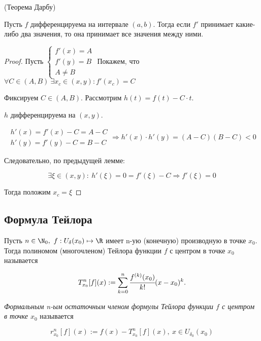 \begin{theorem}
	\hypertarget{thrm6.5}{(Теорема Дарбу)} Пусть $f$ дифференцируема на интервале $(a, b)$. Тогда если $f'$ принимает какие-либо два значения, то она принимает все значения между ними.  
\end{theorem}
\begin{proof} Пусть
	$\begin{cases}
		f'(x) = A \\
		f'(y) = B \\
		A \neq B
	\end{cases}$ Покажем, что $\forall C\in \left(A, B\right) \ \exists x_{c} \in (x,y): f'(x_{c}) = C $
	
	Фиксируем $C \in \left(A, B \right)$. Рассмотрим $h(t) = f(t) - C\cdot t$.
	
	$h$ дифференцируема на $(x,y)$. 
	
	$$\begin{gathered}
		h'(x) = f'(x) - C = A - C \\
		h'(y) = f'(y) - C = B-C
	\end{gathered}
	\Rightarrow h'(x)\cdot h'(y) = \left(A-C\right)\left(B-C\right) < 0 $$
	
	Следовательно, по предыдущей лемме:
	
	$$\exists \xi \in (x,y): \ h'(\xi) = 0 = f'(\xi) - C \Rightarrow f'(\xi) = 0$$
	
	Тогда положим $x_{c} = \xi$
\end{proof}

\subsection{Формула Тейлора}

\begin{definition}
	Пусть $n \in \N_{0},$ $f: U_{\delta}(x_{0})\mapsto \R$ имеет n-ую (конечную) производную в точке $x_{0}$. Тогда \hypertarget{def5.13}{полиномом (многочленом) Тейлора функции $f$ с центром в точке $x_{0}$} называется
	
	$$T_{x_{0}}^{n} [f](x) := \sum\limits_{k = 0}^n \cfrac{f^{(k)}(x_{0})}{k!}(x-x_{0})^{k}.$$ 
\end{definition}

\begin{definition}
	\textit{Формальным n-ым остаточным членом формулы Тейлора функции $f$ с центром в точке $x_{0}$} называется 
	
	$$r_{x_{0}}^{n} [f](x):= f(x) -T_{x_{0}}^{n} [f](x),\ x\in U_{\delta_{0}}(x_{0}) $$
\end{definition}

